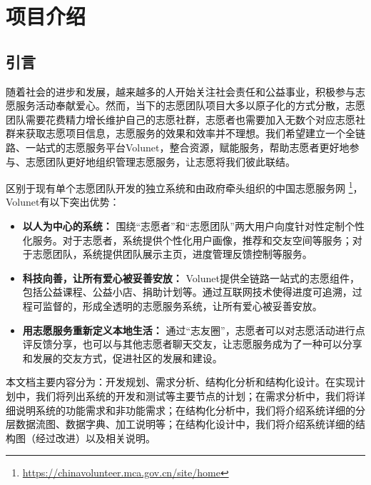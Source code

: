\section{项目介绍}
\subsection{引言}
随着社会的进步和发展，越来越多的人开始关注社会责任和公益事业，积极参与志愿服务活动奉献爱心。然而，当下的志愿团队项目大多以原子化的方式分散，志愿团队需要花费精力增长维护自己的志愿社群，志愿者也需要加入无数个对应志愿社群来获取志愿项目信息，志愿服务的效果和效率并不理想。我们希望建立一个全链路、一站式的志愿服务平台Volunet，整合资源，赋能服务，帮助志愿者更好地参与、志愿团队更好地组织管理志愿服务，让志愿将我们彼此联结。

区别于现有单个志愿团队开发的独立系统和由政府牵头组织的中国志愿服务网 \footnote{\href{https://chinavolunteer.mca.gov.cn/site/home}{https://chinavolunteer.mca.gov.cn/site/home}}，Volunet有以下突出优势：

\begin{itemize}[itemsep=2pt,topsep=2pt,parsep=4pt,itemindent=2em]
    \item \textbf{以人为中心的系统：} 围绕“志愿者”和“志愿团队”两大用户向度针对性定制个性化服务。对于志愿者，系统提供个性化用户画像，推荐和交友空间等服务；对于志愿团队，系统提供团队展示主页，进度管理反馈控制等服务。
    \item \textbf{科技向善，让所有爱心被妥善安放：} Volunet提供全链路一站式的志愿组件，包括公益课程、公益小店、捐助计划等。通过互联网技术使得进度可追溯，过程可监督的，形成全透明的志愿服务系统，让所有爱心被妥善安放。
    \item \textbf{用志愿服务重新定义本地生活：} 通过“志友圈”，志愿者可以对志愿活动进行点评反馈分享，也可以与其他志愿者聊天交友，让志愿服务成为了一种可以分享和发展的交友方式，促进社区的发展和建设。\\
\end{itemize}




本文档主要内容分为：开发规划、需求分析、结构化分析和结构化设计。在实现计划中，我们将列出系统的开发和测试等主要节点的计划；在需求分析中，我们将详细说明系统的功能需求和非功能需求；在结构化分析中，我们将介绍系统详细的分层数据流图、数据字典、加工说明等；在结构化设计中，我们将介绍系统详细的结构图（经过改进）以及相关说明。

